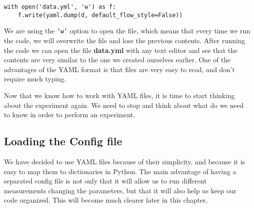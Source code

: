 \begin{verbatim}
with open('data.yml', 'w') as f:
    f.write(yaml.dump(d, default_flow_style=False))
\end{verbatim}

We are using the \texttt{'w'} option to open the file, which means that every time we run the code, we will overwrite the file and lose the previous contents. After running the code we can open the file \textbf{data.yml} with any text editor and see that the contents are very similar to the one we created ourselves earlier. One of the advantages of the YAML format is that files are very easy to read, and don't require much typing.





Now that we know how to work with YAML files, it is time to start thinking about the experiment again. We need to stop and think about what do we need to know in order to perform an experiment.


\subsection{Loading the Config file}\label{subsection:loading-the-config}
We have decided to use YAML files because of their simplicity, and because it is easy to map them to dictionaries in Python. The main advantage of having a separated config file is not only that it will allow us to run different measurements changing the parameters, but that it will also help us keep our code organized. This will become much clearer later in this chapter.

